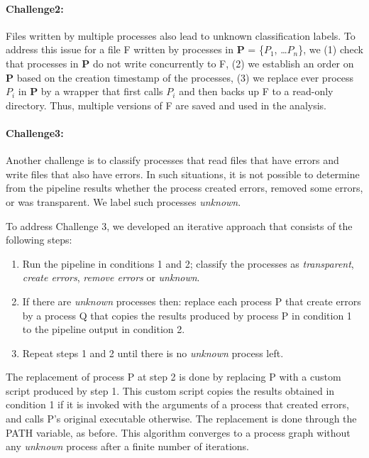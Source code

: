 \documentclass{article}
\begin{document}
{\paragraph{Challenge2:} Files written by multiple processes also lead 
to unknown classification labels. To address this issue for a file F 
written by processes in \textbf{P} = \{$P_{1}$, \ldots $P_{n}$\}, we 
(1) check that processes in \textbf{P} do not write concurrently to F, 
(2) we establish an order on \textbf{P} based on the creation timestamp 
of the processes, (3) we replace ever process $P_{i}$ in \textbf{P} by 
a wrapper that first calls $P_{i}$ and then backs up F to a read-only 
directory. Thus, multiple versions of F are saved and used in the 
analysis. 

\paragraph{Challenge3:} Another challenge is to classify processes that 
read files that have errors and write files that also have errors. In 
such situations, it is not possible to determine from the pipeline 
results whether the process created errors, removed some errors, or was 
transparent. We label such processes \emph{unknown}. 

To address Challenge 3, we developed an iterative approach that 
consists of the following steps: 

\begin{enumerate}
  \item Run the pipeline in conditions 1 and 2; classify the
    processes as \emph{transparent}, \emph{create errors},
    \emph{remove errors} or \emph{unknown}.
  \item If there are \emph{unknown} processes then: replace each process P that create errors by a process Q that
    copies the results produced by process P in condition 1 to the pipeline output in condition 2.
  \item Repeat steps 1 and 2 until there is no \emph{unknown} process left.
\end{enumerate}

The replacement of process P at step 2 is done by replacing P with a 
custom script produced by step 1. This custom script copies the results 
obtained in condition 1 if it is invoked with the arguments of a 
process that created errors, and calls P's original executable 
otherwise. The replacement is done through the PATH variable, as 
before. This algorithm converges to a process graph without any 
\emph{unknown} process after a finite number of iterations.

}
\end{document}
